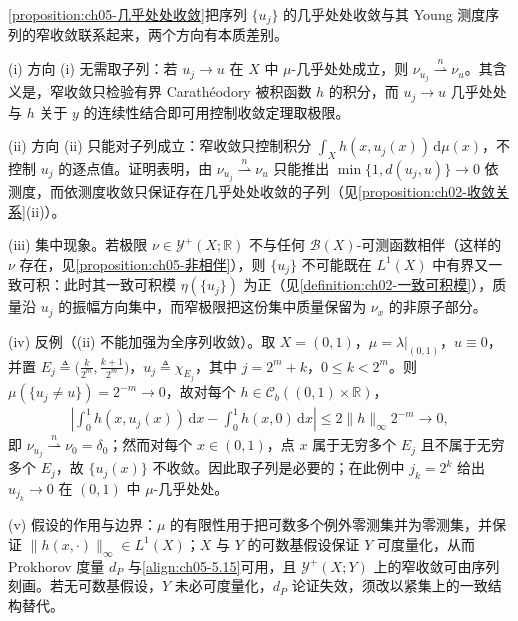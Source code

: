 \documentclass[../../main.tex]{subfiles}%
\begin{document}
\begin{remark}\label{remark:ch05-收敛注}
\cref{proposition:ch05-几乎处处收敛}把序列 $\{u_j\}$ 的几乎处处收敛与其 Young 测度序列的窄收敛联系起来，两个方向有本质差别。

(i) 方向 (i) 无需取子列：若 $u_j\to u$ 在 $X$ 中 $\mu$-几乎处处成立，则 $\nu_{u_j}\stackrel{n}{\rightharpoonup}\nu_u$。其含义是，窄收敛只检验有界 Carathéodory 被积函数 $h$ 的积分，而 $u_j\to u$ 几乎处处与 $h$ 关于 $y$ 的连续性结合即可用控制收敛定理取极限。

(ii) 方向 (ii) 只能对子列成立：窄收敛只控制积分 $\int_Xh(x,u_j(x))\,\mathrm{d}\mu(x)$，不控制 $u_j$ 的逐点值。证明表明，由 $\nu_{u_j}\stackrel{n}{\rightharpoonup}\nu_u$ 只能推出 $\min\{1,d(u_j,u)\}\to0$ 依测度，而依测度收敛只保证存在几乎处处收敛的子列（见\cref{proposition:ch02-收敛关系}(ii)）。

(iii) 集中现象。若极限 $\nu\in\mathcal{Y}^+(X;\mathbb{R})$ 不与任何 $\mathscr{B}(X)$-可测函数相伴（这样的 $\nu$ 存在，见\cref{proposition:ch05-非相伴}），则 $\{u_j\}$ 不可能既在 $L^1(X)$ 中有界又一致可积：此时其一致可积模 $\eta(\{u_j\})$ 为正（见\cref{definition:ch02-一致可积模}），质量沿 $u_j$ 的振幅方向集中，而窄极限把这份集中质量保留为 $\nu_x$ 的非原子部分。

(iv) 反例（(ii) 不能加强为全序列收敛）。取 $X=(0,1)$，$\mu=\lambda|_{(0,1)}$，$u\equiv0$，并置 $E_j\triangleq\big(\tfrac{k}{2^m},\tfrac{k+1}{2^m}\big)$，$u_j\triangleq\chi_{E_j}$，其中 $j=2^m+k$，$0\leqslant k<2^m$。则 $\mu(\{u_j\neq u\})=2^{-m}\to0$，故对每个 $h\in\mathcal{C}_b((0,1)\times\mathbb{R})$，
\begin{align*}
\left|\int_0^1h(x,u_j(x))\,\mathrm{d}x-\int_0^1h(x,0)\,\mathrm{d}x\right|\leqslant2\|h\|_\infty2^{-m}\to0,
\end{align*}
即 $\nu_{u_j}\stackrel{n}{\rightharpoonup}\nu_0=\delta_0$；然而对每个 $x\in(0,1)$，点 $x$ 属于无穷多个 $E_j$ 且不属于无穷多个 $E_j$，故 $\{u_j(x)\}$ 不收敛。因此取子列是必要的；在此例中 $j_k=2^k$ 给出 $u_{j_k}\to0$ 在 $(0,1)$ 中 $\mu$-几乎处处。

(v) 假设的作用与边界：$\mu$ 的有限性用于把可数多个例外零测集并为零测集，并保证 $\|h(x,\cdot)\|_\infty\in L^1(X)$；$X$ 与 $Y$ 的可数基假设保证 $Y$ 可度量化，从而 Prokhorov 度量 $d_P$ 与\eqref{align:ch05-5.15}可用，且 $\mathcal{Y}^+(X;Y)$ 上的窄收敛可由序列刻画。若无可数基假设，$Y$ 未必可度量化，$d_P$ 论证失效，须改以紧集上的一致结构替代。
\end{remark}
\end{document}
